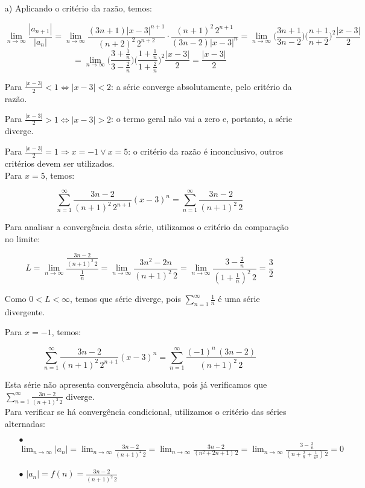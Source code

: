 \documentclass[12pt,a4paper]{article}
\begin{document}
\begin{itemize}
\item[a)] Aplicando o critério da razão, temos:

$$\lim_{n\rightarrow\infty} \frac{|a_{n+1}|}{|a_n|} = \lim_{n\rightarrow\infty} \frac{(3n+1) |x-3|^{n+1}}{(n+2)^2 \, 2^{n+2}}  \cdot \frac{(n+1)^2 \, 2^{n+1}}{(3n-2) |x-3|^n} = \lim_{n\rightarrow\infty} \Big( \frac{3n+1}{3n-2} \Big) \Big( \frac{n+1}{n+2} \Big)^2 \frac{|x-3|}{2}  $$
$$ = \lim_{n\rightarrow\infty} \Bigg( \frac{3+\frac{1}{n}}{3-\frac{2}{n}} \Bigg) \Bigg( \frac{1+\frac{1}{n}}{1+\frac{2}{n}} \Bigg)^2 \frac{|x-3|}{2} = \frac{|x-3|}{2} $$

Para $\frac{|x-3|}{2} < 1 \Leftrightarrow |x-3| < 2$: a série converge absolutamente, pelo critério da razão.

Para $\frac{|x-3|}{2} > 1 \Leftrightarrow |x-3| > 2$: o termo geral não vai a zero e, portanto, a série diverge.

Para $\frac{|x-3|}{2} = 1 \Rightarrow x = -1 \lor x=5$: o critério da razão é inconclusivo, outros critérios devem ser utilizados. \\

Para $x=5$, temos:

$$  \sum_{n=1}^\infty \frac{3n-2}{(n+1)^2 \, 2^{n+1}} (x-3)^n = \sum_{n=1}^\infty \frac{3n-2}{(n+1)^2 \, 2} $$

Para analisar a convergência desta série, utilizamos o critério da comparação no limite:

$$ L = \lim_{n\rightarrow\infty} \frac{\frac{3n-2}{(n+1)^2 \, 2}}{\frac{1}{n}} = \lim_{n\rightarrow\infty} \frac{3n^2-2n}{(n+1)^2 \, 2} = \lim_{n\rightarrow\infty} \frac{3-\frac{2}{n}}{(1+\frac{1}{n})^2 \, 2} = \frac{3}{2}  $$

Como $0 < L < \infty$, temos que série diverge, pois $\displaystyle\sum_{n=1}^\infty \frac{1}{n}$ é uma série divergente.

Para $x=-1$, temos:

$$  \sum_{n=1}^\infty \frac{3n-2}{(n+1)^2 \, 2^{n+1}} (x-3)^n = \sum_{n=1}^\infty \frac{(-1)^n \, (3n-2)}{(n+1)^2 \, 2} $$

Esta série não apresenta convergência absoluta, pois já verificamos que $\displaystyle\sum_{n=1}^\infty \frac{3n-2}{(n+1)^2 \, 2}$ diverge. \\

Para verificar se há convergência condicional, utilizamos o critério das séries alternadas: 
    
    \begin{itemize}
    \item[$\bullet$] $\displaystyle\lim_{n \rightarrow \infty} |a_n| = \lim_{n \rightarrow \infty} \frac{3n-2}{(n+1)^2 \, 2} = \lim_{n \rightarrow \infty} \frac{3n-2}{(n^2 + 2n + 1) \, 2} = \lim_{n \rightarrow \infty} \frac{3-\frac{2}{n}}{(n + \frac{2}{n} + \frac{1}{n^2}) \, 2} = 0 $
    \item[$\bullet$] $|a_{n}| = f(n) = \displaystyle\frac{3n-2}{(n+1)^2 \, 2}  $
    

\end{itemize}
\end{itemize}
\end{document}
